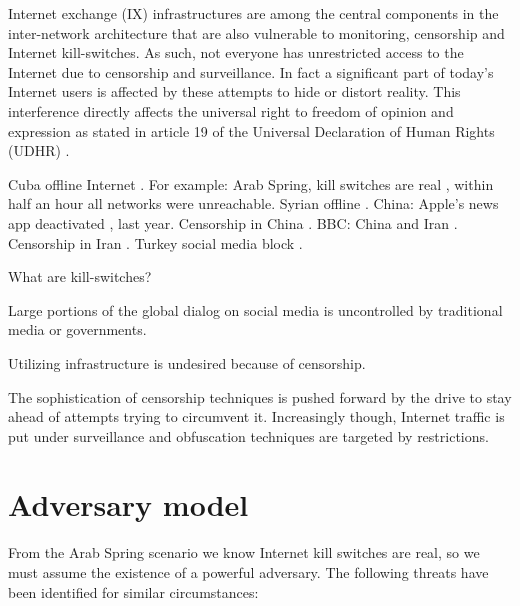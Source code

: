 Internet exchange (IX) infrastructures are among the central components in the inter-network architecture that are also vulnerable to monitoring, censorship and Internet kill-switches.
As such, not everyone has unrestricted access to the Internet due to censorship and surveillance.
In fact a significant part of today's Internet users is affected by these attempts to hide or distort reality. %
This interference directly affects the universal right to freedom of opinion and expression as stated in article 19 of the Universal Declaration of Human Rights (UDHR) \cite{UDHR}.

Cuba offline Internet \cite{watts2014havana}.
For example: Arab Spring, kill switches are real \cite{renesys2011egypt}, within half an hour all networks were unreachable. Syrian offline \cite{renesys2012syria}.
China: Apple's news app deactivated \cite{nyt2015appleChina}, last year. Censorship in China \cite{hrw2006china}.
BBC: China and Iran \cite{kathuria2010bypassing}. Censorship in Iran \cite{halderman2013iran}.
Turkey social media block \cite{twitter2015turkey}.

What are kill-switches?


Large portions of the global dialog on social media is uncontrolled by traditional media or governments.

Utilizing infrastructure is undesired because of censorship.


The sophistication of censorship techniques is pushed forward by the drive to stay ahead of attempts trying to circumvent it.
Increasingly though, Internet traffic is put under surveillance and obfuscation techniques are targeted by restrictions.


\section{Adversary model}\label{sec:adversary_model}
From the Arab Spring scenario we know Internet kill switches are real, so we must assume the existence of a powerful adversary.
The following threats \cite{ietf-shadow-internet} have been identified for similar circumstances:

